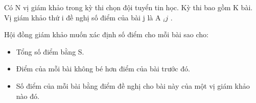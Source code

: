 Có N vị giám khảo trong kỳ thi chọn đội tuyển tin học. Kỳ thi bao gồm K bài. Vị giám khảo thứ i đề nghị số điểm của bài j là A $_ ij $ .

Hội đồng giám khảo muốn xác định số điểm cho mỗi bài sao cho:
\begin{itemize}
	\item Tổng số điểm bằng S.
	\item Điểm của mỗi bài không bé hơn điểm của bài trước đó.
	\item Số điểm của mỗi bài bằng điểm đề nghị cho bài này của một vị giám khảo nào đó.
\end{itemize}

\